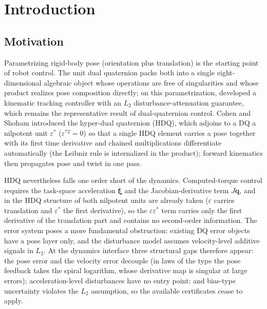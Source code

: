 \section{Introduction}

\subsection{Motivation}

Parametrizing rigid-body pose (orientation plus translation) is the starting point of robot control. The unit dual quaternion packs both into a single eight-dimensional algebraic object whose operations are free of singularities and whose product realizes pose composition directly; on this parametrization, \cite{P2} developed a kinematic tracking controller with an $L_2$ disturbance-attenuation guarantee, which remains the representative result of dual-quaternion control. Cohen and Shoham \cite{P1} introduced the hyper-dual quaternion (HDQ), which adjoins to a DQ a nilpotent unit $\varepsilon^{*}$ ($\varepsilon^{*2}=0$) so that a single HDQ element carries a pose together with its first time derivative and chained multiplications differentiate automatically (the Leibniz rule is internalized in the product); forward kinematics then propagates pose and twist in one pass.

HDQ nevertheless falls one order short of the dynamics. Computed-torque control requires the task-space acceleration $\dot{\boldsymbol\xi}$ and the Jacobian-derivative term $\dot J\dot{\boldsymbol q}$, and in the HDQ structure of \cite{P1} both nilpotent units are already taken ($\varepsilon$ carries translation and $\varepsilon^{*}$ the first derivative), so the $\varepsilon\varepsilon^{*}$ term carries only the first derivative of the translation part and contains no second-order information. The error system poses a more fundamental obstruction: existing DQ error objects have a pose layer only, and the disturbance model assumes velocity-level additive signals in $L_2$. At the dynamics interface three structural gaps therefore appear: the pose error and the velocity error decouple (in laws of the \cite{Ch20} type the pose feedback takes the spiral logarithm, whose derivative map is singular at large errors); acceleration-level disturbances have no entry point; and bias-type uncertainty violates the $L_2$ assumption, so the available certificates cease to apply.

